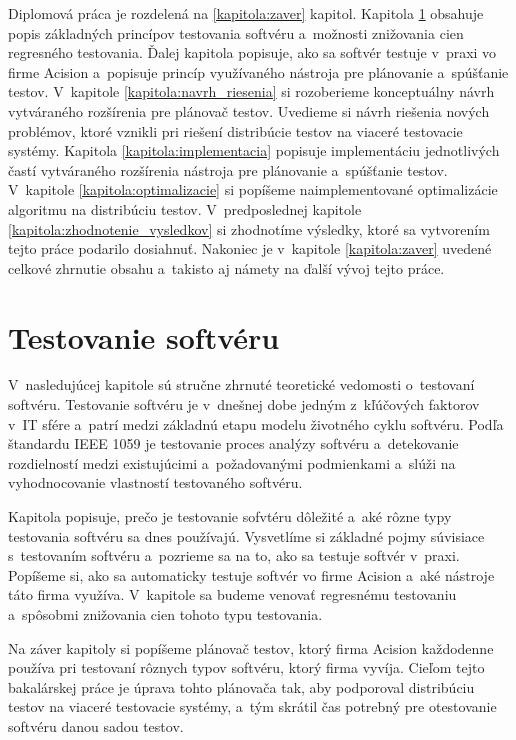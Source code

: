 Diplomová práca je rozdelená na \ref{kapitola:zaver} kapitol. 
Kapitola \ref{kapitola:testovanie_softveru} obsahuje popis základných
princípov testovania softvéru a~možnosti znižovania cien regresného testovania.
Ďalej kapitola popisuje, ako sa softvér testuje v~praxi vo firme Acision
a~popisuje princíp využívaného nástroja pre plánovanie a~spúšťanie testov.
V~kapitole \ref{kapitola:navrh_riesenia} si rozoberieme konceptuálny
návrh vytváraného rozšírenia pre plánovač testov. 
Uvedieme si návrh riešenia nových problémov, ktoré vznikli pri riešení
distribúcie testov na viaceré testovacie systémy.
Kapitola \ref{kapitola:implementacia} popisuje implementáciu jednotlivých
častí vytváraného rozšírenia nástroja pre plánovanie a~spúšťanie testov.
V~kapitole \ref{kapitola:optimalizacie} si popíšeme naimplementované 
optimalizácie algoritmu na distribúciu testov. V~predposlednej kapitole 
\ref{kapitola:zhodnotenie_vysledkov} si zhodnotíme výsledky, ktoré sa 
vytvorením tejto práce podarilo dosiahnuť. Nakoniec je v~kapitole
\ref{kapitola:zaver} uvedené celkové zhrnutie obsahu a~takisto aj námety
na ďalší vývoj tejto práce. 



%
%
\chapter{Testovanie softvéru}
\label{kapitola:testovanie_softveru}
V~nasledujúcej kapitole sú stručne zhrnuté teoretické vedomosti 
o~testovaní softvéru. 
Testovanie softvéru je v~dnešnej dobe jedným z~kľúčových faktorov v~IT 
sfére a~patrí medzi základnú etapu modelu životného cyklu softvéru.
Podľa štandardu IEEE 1059 \cite{Ieee} je testovanie proces analýzy 
softvéru a~detekovanie rozdielností medzi existujúcimi a~požadovanými 
podmienkami a~slúži na vyhodnocovanie vlastností testovaného softvéru. 

Kapitola popisuje, prečo je testovanie sofvtéru 
dôležité a~aké rôzne typy testovania softvéru sa dnes používajú. 
Vysvetlíme si základné pojmy súvisiace s~testovaním softvéru a~pozrieme
sa na to, ako sa testuje softvér v~praxi.
Popíšeme si, ako sa automaticky testuje softvér vo firme Acision
a~aké nástroje táto firma využíva. 
V~kapitole sa budeme venovať regresnému testovaniu a~spôsobmi znižovania
cien tohoto typu testovania. 

Na záver kapitoly si popíšeme plánovač testov, ktorý firma Acision 
každodenne používa pri testovaní rôznych typov softvéru, ktorý firma vyvíja. 
Cieľom tejto bakalárskej práce je úprava tohto plánovača tak, aby 
podporoval distribúciu testov na viaceré testovacie systémy, a~tým skrátil
čas potrebný pre otestovanie softvéru danou sadou testov. 

